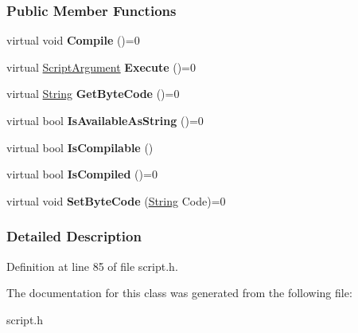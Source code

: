 \subsubsection*{Public Member Functions}
\begin{DoxyCompactItemize}
\item 
\hypertarget{classMezzanine_1_1Scripting_1_1ScriptCompilable_a6681e2c2d8c01e3eb04e2b7472f7dd0c}{
virtual void {\bfseries Compile} ()=0}
\label{classMezzanine_1_1Scripting_1_1ScriptCompilable_a6681e2c2d8c01e3eb04e2b7472f7dd0c}

\item 
\hypertarget{classMezzanine_1_1Scripting_1_1ScriptCompilable_acbd83460782af0411fccf6dc769ce8ad}{
virtual \hyperlink{classMezzanine_1_1Scripting_1_1ScriptArgument}{ScriptArgument} {\bfseries Execute} ()=0}
\label{classMezzanine_1_1Scripting_1_1ScriptCompilable_acbd83460782af0411fccf6dc769ce8ad}

\item 
\hypertarget{classMezzanine_1_1Scripting_1_1ScriptCompilable_a7c0f68ed0deb1136e1e374cd842e152e}{
virtual \hyperlink{namespaceMezzanine_acf9fcc130e6ebf08e3d8491aebcf1c86}{String} {\bfseries GetByteCode} ()=0}
\label{classMezzanine_1_1Scripting_1_1ScriptCompilable_a7c0f68ed0deb1136e1e374cd842e152e}

\item 
\hypertarget{classMezzanine_1_1Scripting_1_1ScriptCompilable_ac81f66d0d71776b7cb153627f587d69a}{
virtual bool {\bfseries IsAvailableAsString} ()=0}
\label{classMezzanine_1_1Scripting_1_1ScriptCompilable_ac81f66d0d71776b7cb153627f587d69a}

\item 
\hypertarget{classMezzanine_1_1Scripting_1_1ScriptCompilable_a0f8769ae4360f309c998564ebfa82524}{
virtual bool {\bfseries IsCompilable} ()}
\label{classMezzanine_1_1Scripting_1_1ScriptCompilable_a0f8769ae4360f309c998564ebfa82524}

\item 
\hypertarget{classMezzanine_1_1Scripting_1_1ScriptCompilable_a82542559d222aa021ad3d37af12c8063}{
virtual bool {\bfseries IsCompiled} ()=0}
\label{classMezzanine_1_1Scripting_1_1ScriptCompilable_a82542559d222aa021ad3d37af12c8063}

\item 
\hypertarget{classMezzanine_1_1Scripting_1_1ScriptCompilable_a5c97eaa5a76225709e94c392ac49e4a6}{
virtual void {\bfseries SetByteCode} (\hyperlink{namespaceMezzanine_acf9fcc130e6ebf08e3d8491aebcf1c86}{String} Code)=0}
\label{classMezzanine_1_1Scripting_1_1ScriptCompilable_a5c97eaa5a76225709e94c392ac49e4a6}

\end{DoxyCompactItemize}


\subsubsection{Detailed Description}


Definition at line 85 of file script.h.



The documentation for this class was generated from the following file:\begin{DoxyCompactItemize}
\item 
script.h\end{DoxyCompactItemize}
